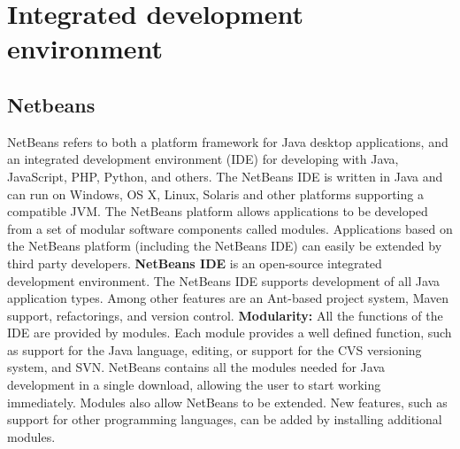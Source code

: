 \section{Integrated development environment}

\subsection{Netbeans}
NetBeans refers to both a platform framework for Java desktop applications, and an integrated development environment (IDE) for developing with Java, JavaScript, PHP, Python, and others.
The NetBeans IDE is written in Java and can run on Windows, OS X, Linux, Solaris and other platforms supporting a compatible JVM. 
\newline
\newline
The NetBeans platform allows applications to be developed from a set of modular software components called modules. Applications based on the NetBeans platform (including the NetBeans IDE) can easily be extended by third party developers.
\newline
\newline
\textbf{NetBeans IDE} is an open-source integrated development environment. The NetBeans IDE supports development of all Java application types. Among other features are an Ant-based project system, Maven support, refactorings, and version control.
\newline
\newline
\textbf{Modularity:} All the functions of the IDE are provided by modules. Each module provides a well defined function, such as support for the Java language, editing, or support for the CVS versioning system, and SVN. NetBeans contains all the modules needed for Java development in a single download, allowing the user to start working immediately. Modules also allow NetBeans to be extended. New features, such as support for other programming languages, can be added by installing additional modules.